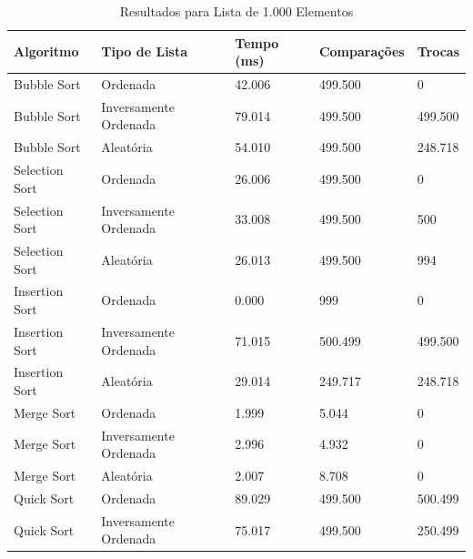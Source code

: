 \documentclass[tcc2]{uftex}
\begin{document}
\begin{table}[h]
\centering
\caption{Resultados para Lista de 1.000 Elementos}
\begin{tabular}{|l|l|l|l|l|}
\hline
\textbf{Algoritmo}   & \textbf{Tipo de Lista}       & \textbf{Tempo (ms)} & \textbf{Comparações} & \textbf{Trocas} \\ \hline
Bubble Sort          & Ordenada                     & 42.006              & 499.500              & 0              \\ \hline
Bubble Sort          & Inversamente Ordenada        & 79.014              & 499.500              & 499.500        \\ \hline
Bubble Sort          & Aleatória                    & 54.010              & 499.500              & 248.718        \\ \hline
Selection Sort       & Ordenada                     & 26.006              & 499.500              & 0              \\ \hline
Selection Sort       & Inversamente Ordenada        & 33.008              & 499.500              & 500            \\ \hline
Selection Sort       & Aleatória                    & 26.013              & 499.500              & 994            \\ \hline
Insertion Sort       & Ordenada                     & 0.000               & 999                  & 0              \\ \hline
Insertion Sort       & Inversamente Ordenada        & 71.015              & 500.499              & 499.500        \\ \hline
Insertion Sort       & Aleatória                    & 29.014              & 249.717              & 248.718        \\ \hline
Merge Sort           & Ordenada                     & 1.999               & 5.044                & 0              \\ \hline
Merge Sort           & Inversamente Ordenada        & 2.996               & 4.932                & 0              \\ \hline
Merge Sort           & Aleatória                    & 2.007               & 8.708                & 0              \\ \hline
Quick Sort           & Ordenada                     & 89.029              & 499.500              & 500.499        \\ \hline
Quick Sort           & Inversamente Ordenada        & 75.017              & 499.500              & 250.499        \\ \hline

\end{tabular}
\end{table}
\end{document}
